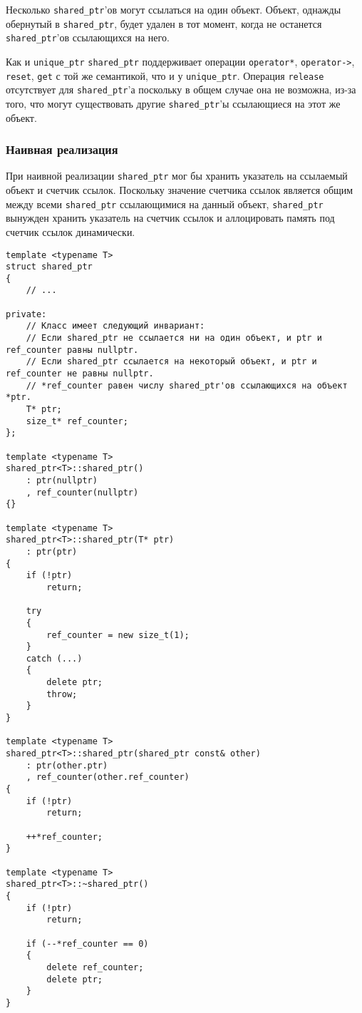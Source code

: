 Несколько \texttt{shared_ptr}'ов могут ссылаться на один объект. Объект, однажды обернутый в \texttt{shared_ptr}, будет удален в тот момент, когда не останется \texttt{shared_ptr}'ов ссылающихся на него.

Как и \texttt{unique_ptr} \texttt{shared_ptr} поддерживает операции \texttt{operator*}, \texttt{operator->}, \texttt{reset}, \texttt{get} с той же семантикой, что и у \texttt{unique_ptr}. Операция \texttt{release} отсутствует для \texttt{shared_ptr}'а поскольку в общем случае она не возможна, из-за того, что могут существовать другие \texttt{shared_ptr}'ы ссылающиеся на этот же объект.

\subsubsection{Наивная реализация}

При наивной реализации \texttt{shared_ptr} мог бы хранить указатель на ссылаемый объект и счетчик ссылок. Поскольку значение счетчика ссылок является общим между всеми \texttt{shared_ptr} ссылающимися на данный объект, \texttt{shared_ptr} вынужден хранить указатель на счетчик ссылок и аллоцировать память под счетчик ссылок динамически.

\begin{verbatim}
template <typename T>
struct shared_ptr
{
    // ...

private:
    // Класс имеет следующий инвариант:
    // Если shared_ptr не ссылается ни на один объект, и ptr и ref_counter равны nullptr.
    // Если shared_ptr ссылается на некоторый объект, и ptr и ref_counter не равны nullptr.
    // *ref_counter равен числу shared_ptr'ов ссылающихся на объект *ptr.
    T* ptr;
    size_t* ref_counter;
};

template <typename T>
shared_ptr<T>::shared_ptr()
    : ptr(nullptr)
    , ref_counter(nullptr)
{}

template <typename T>
shared_ptr<T>::shared_ptr(T* ptr)
    : ptr(ptr)
{
    if (!ptr)
        return;

    try
    {
        ref_counter = new size_t(1);
    }
    catch (...)
    {
        delete ptr;
        throw;
    }
}

template <typename T>
shared_ptr<T>::shared_ptr(shared_ptr const& other)
    : ptr(other.ptr)
    , ref_counter(other.ref_counter)
{
    if (!ptr)
        return;

    ++*ref_counter;
}

template <typename T>
shared_ptr<T>::~shared_ptr()
{
    if (!ptr)
        return;

    if (--*ref_counter == 0)
    {
        delete ref_counter;
        delete ptr;
    }
}
\end{verbatim}


